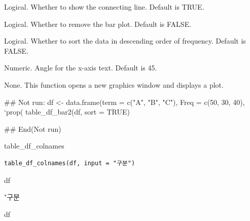 \documentclass[a4paper]{book}
\begin{document}
\begin{Arguments}
\begin{ldescription}
\item[\code{show\_line}] Logical. Whether to show the connecting line. Default is TRUE.

\item[\code{remove\_bar}] Logical. Whether to remove the bar plot. Default is FALSE.

\item[\code{sort}] Logical. Whether to sort the data in descending order of frequency. Default is FALSE.

\item[\code{text\_angle}] Numeric. Angle for the x-axis text. Default is 45.
\end{ldescription}
\end{Arguments}
%
\begin{Value}
None. This function opens a new graphics window and displays a plot.
\end{Value}
%
\begin{Examples}
\begin{ExampleCode}
\#\# Not run: 
df <- data.frame(term = c("A", "B", "C"),
                 Freq = c(50, 30, 40),
                 `prop(%
table_df_bar2(df, sort = TRUE)

## End(Not run)

\end{ExampleCode}
\end{Examples}

%
\begin{Description}
table\_df\_colnames
\end{Description}
%
\begin{Usage}
\begin{verbatim}
table_df_colnames(df, input = "구분")
\end{verbatim}
\end{Usage}
%
\begin{Arguments}
\begin{ldescription}
\item[\code{df}] df

\item[\code{input}] "구분
\end{ldescription}
\end{Arguments}
%
\begin{Value}
df
\end{Value}
\end{document}
